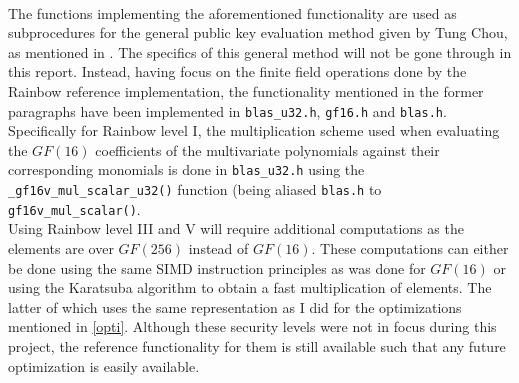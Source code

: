 \medskip\\
The functions implementing the aforementioned functionality are used as subprocedures for the general public key evaluation method given by Tung Chou, as mentioned in \cite{rainbownist}. The specifics of this general method will not be gone through in this report. Instead, having focus on the finite field operations done by the Rainbow reference implementation, the functionality mentioned in the former paragraphs have been implemented in \texttt{blas\_u32.h}, \texttt{gf16.h} and \texttt{blas.h}. Specifically for Rainbow level I, the multiplication scheme used when evaluating the $GF(16)$ coefficients of the multivariate polynomials against their corresponding monomials is done in \texttt{blas\_u32.h} using the \texttt{\_gf16v\_mul\_scalar\_u32()} function (being aliased \texttt{blas.h} to \texttt{gf16v\_mul\_scalar()}.
\medskip\\
Using Rainbow level III and V will require additional computations as the elements are over $GF(256)$ instead of $GF(16)$. These computations can either be done using the same SIMD instruction principles as was done for $GF(16)$ or using the Karatsuba algorithm to obtain a fast multiplication of elements. The latter of which uses the same representation as I did for the optimizations mentioned in \cref{opti}. Although these security levels were not in focus during this project, the reference functionality for them is still available such that any future optimization is easily available.
